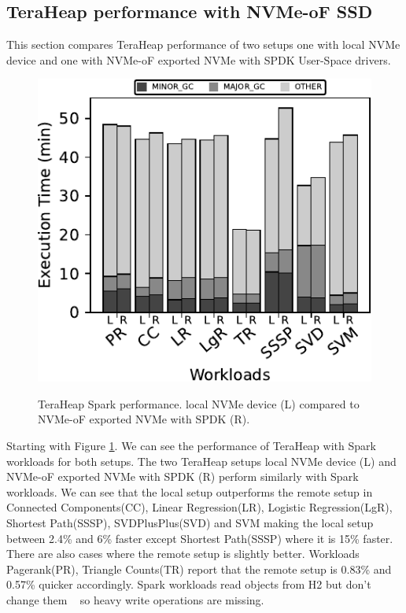 \subsection{TeraHeap performance with NVMe-oF SSD}
\par This section compares TeraHeap performance of two setups one with local NVMe device and one with NVMe-oF exported NVMe with SPDK User-Space drivers.
\begin{figure}[H]
  \includegraphics[width=\linewidth]{figures/bench_spark.pdf}\\
\caption{TeraHeap Spark performance. local NVMe device (L) compared to NVMe-oF exported NVMe with SPDK (R).}
\label{fig:bench_spark}
\end{figure}
Starting with Figure \ref{fig:bench_spark}. We can see the performance of TeraHeap with Spark workloads for both setups.
The two TeraHeap setups local NVMe device (L) and NVMe-oF exported NVMe with
SPDK (R) perform similarly with Spark workloads. We can see that the local setup
outperforms the remote setup in Connected Components(CC), Linear Regression(LR), Logistic Regression(LgR), Shortest Path(SSSP), SVDPlusPlus(SVD) and SVM making the local setup between 2.4\% and 6\% faster except Shortest Path(SSSP) where it is 15\% faster. There are also cases where the remote setup is slightly better. Workloads Pagerank(PR), Triangle Counts(TR) report that the remote
setup is 0.83\% and 0.57\% quicker accordingly. Spark workloads
read objects from H2 but don't change them  ~\cite{spark,teraheap} so heavy
write operations are missing.


